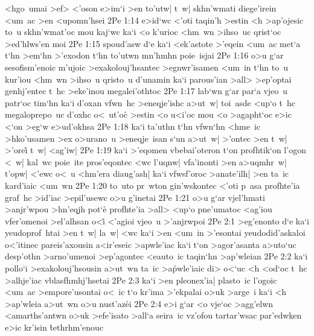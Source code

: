 <hgo~umai
>ef>
<'oson
e>im`i
>en
to'utw|
t~w|
skhn'wmati
diege'irein
<um~ac
>en
<upomn'hsei\bibvsend
\vs 2Pe 1:14
e>id`wc
<'oti
taqin'h
>estin
<h
>ap'ojesic
to~u
skhn'wmat'oc
mou
kaj`wc
ka`i
<o
k'urioc
<hm~wn
>ihso~uc
qrist`oc
>ed'hlws'en
moi\bibvsend
\vs 2Pe 1:15
spoud'asw
d`e
ka`i
<ek'astote
>'eqein
<um~ac
met`a
t`hn
>em`hn
>'exodon
t`hn
to'utwn
mn'hmhn
poie~isjai\bibvsend
\vs 2Pe 1:16
o>u
g`ar
sesofism'enoic
m'ujoic
>exakolouj'hsantec
>egnwr'isamen
<um~in
t`hn
to~u
kur'iou
<hm~wn
>ihso~u
qristo~u
d'unamin
ka`i
parous'ian
>all>
>ep'optai
genhj'entec
t~hc
>eke'inou
megalei'othtoc\bibvsend
\vs 2Pe 1:17
lab`wn
g`ar
par`a
vjeo~u
patr`oc
tim`hn
ka`i
d'oxan
vfwn~hc
>eneqje'ishc
a>ut~w|
toi~asde
<up`o
t~hc
megaloprepo~uc
d'oxhc
o<~ut'oc\r{}
>estin
<o
u<i'oc
mou
<o
>agapht`oc
e>ic
<`on
>eg`w
e>ud'okhsa\bibvsend
\vs 2Pe 1:18
ka`i
ta'uthn
t`hn
vfwn`hn
<hme~ic
>hko'usamen
>ex
o>urano~u
>eneqje~isan
s`un
a>ut~w|
>'ontec
>en
t~w|
>'orei\r{}
t~w|
<ag'iw|\bibvsend
\vs 2Pe 1:19
ka`i
>'eqomen
vbebai'oteron
t`on
profhtik`on
l'ogon
<~w|
kal~wc
poie~ite
pros'eqontec
<wc
l'uqnw|
vfa'inonti
>en
a>uqmhr~w|
t'opw|
<'ewc
o<~u
<hm'era
diaug'ash|
ka`i
vfwsf'oroc
>anate'ilh|
>en
ta~ic
kard'iaic
<um~wn\bibvsend
\vs 2Pe 1:20
to~uto
pr~wton
gin'wskontec
<'oti
p~asa
profhte'ia
graf~hc
>id'iac
>epil'usewc
o>u
g'inetai\bibvsend
\vs 2Pe 1:21
o>u
g`ar
vjel'hmati
>anjr'wpou
>hn'eqjh
pot`e\r{}
profhte'ia
>all>
<up`o
pne'umatoc
<ag'iou
vfer'omenoi
>el'alhsan
o<i\r{}
<'agioi
vjeo~u
>'anjrwpoi\bibvsend
\vs 2Pe 2:1
>eg'enonto
d`e
ka`i
yeudoprof~htai
>en
t~w|
la~w|
<wc
ka`i
>en
<um~in
>'esontai
yeudodid'askaloi
o<'itinec
pareis'axousin
a<ir'eseic
>apwle'iac
ka`i
t`on
>agor'asanta
a>uto`uc
desp'othn
>arno'umenoi
>ep'agontec
<eauto~ic
taqin`hn
>ap'wleian\bibvsend
\vs 2Pe 2:2
ka`i
pollo`i
>exakolouj'hsousin
a>ut~wn
ta~ic
>a\r{p}wle'iaic
di>
o<`uc
<h
<od`oc
t~hc
>alhje'iac
vblasfhmhj'hsetai\bibvsend
\vs 2Pe 2:3
ka`i
>en
pleonex'ia|
plasto~ic
l'ogoic
<um~ac
>empore'usontai
o<~ic
t`o
kr'ima
>'ekpalai
o>uk
>arge~i
ka`i
<h
>ap'wleia
a>ut~wn
o>u
nust'az\r{e}i\bibvsend
{}
\vs 2Pe 2:4
e>i
g`ar
<o
vje`oc
>agg'elwn
<amarths'antwn
o>uk
>efe'isato
>all`a
seira~ic
vz'ofou
tartar'wsac
par'edwken
e>ic
kr'isin
\r{t}ethrhm'enouc\bibvsend
{}
